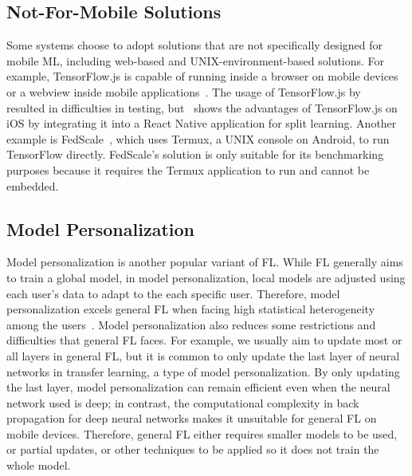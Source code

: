 \documentclass[conference]{IEEEtran}
\begin{document}
\subsection{Not-For-Mobile Solutions}

Some systems choose to adopt solutions that are not specifically designed for
mobile ML,
including web-based and UNIX-environment-based solutions.
For example,
TensorFlow.js is capable of running inside a browser on mobile devices or
a webview inside mobile applications~\cite{smilkov2019tensorflow}.
The usage of TensorFlow.js by~\cite{sriraman2022device} resulted in
difficulties in testing,
but~\cite{palanisamy2021spliteasy} shows the advantages of TensorFlow.js on iOS
by integrating it into a React Native application for split learning.
Another example is FedScale~\cite{lai2022fedscale},
which uses Termux, a UNIX console on Android,
to run TensorFlow directly.
FedScale's solution is only suitable for its benchmarking purposes because
it requires the Termux application to run and
cannot be embedded.

\subsection{Model Personalization}

Model personalization is another popular variant of FL.
While FL generally aims to train a global model,
in model personalization,
local models are adjusted using each user's data to
adapt to the each specific user.
Therefore, model personalization excels general FL when
facing high statistical heterogeneity among the users~\cite{kulkarni2020survey}.
Model personalization also reduces some restrictions and difficulties that
general FL faces.
For example,
we usually aim to update most or all layers in general FL,
but it is common to only update the last layer of neural networks in
transfer learning,
a type of model personalization.
By only updating the last layer,
model personalization can remain efficient even when
the neural network used is deep;
in contrast, the computational complexity in back propagation for
deep neural networks makes it unsuitable for general FL on mobile devices.
Therefore, general FL either requires smaller models to be used,
or partial updates,
or other techniques to be applied so it does not train the whole model.

\end{document}
